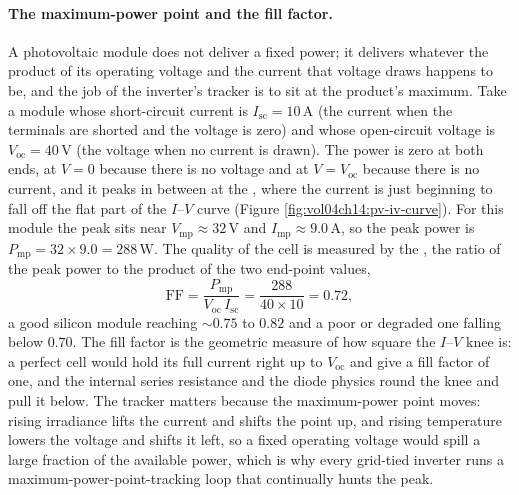 \paragraph{The maximum-power point and the fill factor.} A photovoltaic
module does not deliver a fixed power; it delivers whatever the product of its
operating voltage and the current that voltage draws happens to be, and the
job of the inverter's tracker is to sit at the product's maximum. Take a
module whose short-circuit current is $I_{\text{sc}} = 10\,\si{\ampere}$ (the
current when the terminals are shorted and the voltage is zero) and whose
open-circuit voltage is $V_{\text{oc}} = 40\,\si{\volt}$ (the voltage when no
current is drawn). The power is zero at both ends, at $V = 0$ because there is
no voltage and at $V = V_{\text{oc}}$ because there is no current, and it
peaks in between at the , where the current is
just beginning to fall off the flat part of the $I$--$V$ curve (Figure
\ref{fig:vol04ch14:pv-iv-curve}). For this module the peak sits near
$V_{\text{mp}} \approx 32\,\si{\volt}$ and $I_{\text{mp}} \approx 9.0\,\si{
\ampere}$, so the peak power is $P_{\text{mp}} = 32\times 9.0 = 288\,\si{
\watt}$. The quality of the cell is measured by the , the
ratio of the peak power to the product of the two end-point values,
\[
\text{FF} = \frac{P_{\text{mp}}}{V_{\text{oc}}\,I_{\text{sc}}}
= \frac{288}{40\times 10} = 0.72,
\]
a good silicon module reaching $\sim 0.75$ to $0.82$ and a poor or degraded
one falling below $0.70$. The fill factor is the geometric measure of how
square the $I$--$V$ knee is: a perfect cell would hold its full current right
up to $V_{\text{oc}}$ and give a fill factor of one, and the internal series
resistance and the diode physics round the knee and pull it below. The
tracker matters because the maximum-power point moves: rising irradiance lifts
the current and shifts the point up, and rising temperature lowers the voltage
and shifts it left, so a fixed operating voltage would spill a large fraction
of the available power, which is why every grid-tied inverter runs a
maximum-power-point-tracking loop that continually hunts the peak.

